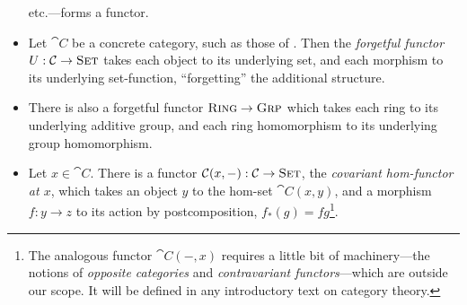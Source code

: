 \begin{ex}
\begin{itemize}
      etc.---forms a functor.
    \item Let $\cat{C}$ be a concrete category, such as those of .
      Then the \emph{forgetful functor} $U: {\mathcal{C}}\to{\textsc{\text{Set}}}$ takes each object to
      its underlying set, and each morphism to its underlying set-function,
      ``forgetting'' the additional structure.
    \item There is also a forgetful functor ${\textsc{\text{Ring}}}\to{\textsc{\text{Grp}}}$ which
      takes each ring to its underlying additive group, and each ring
      homomorphism to its underlying group homomorphism.
    \item Let $x\in\cat{C}$. There is a functor ${\mathcal{C}}(x, -):
      {\mathcal{C}}\to{\textsc{\text{Set}}}$, the \emph{covariant hom-functor at $x$}, which takes an
      object $y$ to the hom-set $\cat{C}(x, y)$, and a morphism $f: y\to z$ to
      its action by postcomposition, $f_*(g) = fg$\footnote{The analogous functor
        $\cat{C}(-, x)$ requires a little bit of machinery---the notions of
      \emph{opposite categories} and \emph{contravariant functors}---which are
    outside our scope. It will be defined in any introductory text on category
    theory.}.
  \end{itemize}
\end{ex}

